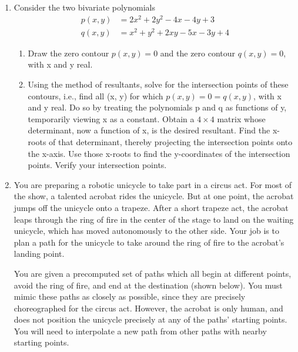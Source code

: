 \documentclass[conference,onecolumn]{IEEEtran}
\begin{document}
\begin{enumerate}[label=\arabic{enumi}.]
          \clearpage
    \item Consider the two bivariate polynomials
          \begin{align*}
              p(x, y) & = 2 x^2 + 2 y^2 - 4x - 4y + 3   \\
              q(x, y) & = x^2 + y^2 + 2xy - 5x - 3y + 4
          \end{align*}

          \begin{enumerate}
              \item Draw the zero contour $p(x, y) = 0$ and the zero contour $q(x, y) = 0$, with x and y real.
              \item Using the method of resultants, solve for the intersection points of these contours, i.e., find all (x, y) for which $p(x, y) = 0 = q(x, y)$, with x and y real.
                    Do so by treating the polynomials p and q as functions of y, temporarily viewing x as a constant.
                    Obtain a $4 \times 4$ matrix whose determinant, now a function of x, is the desired resultant.
                    Find the x-roots of that determinant, thereby projecting the intersection points onto the x-axis.
                    Use those x-roots to find the y-coordinates of the intersection points.
                    Verify your intersection points.
          \end{enumerate}

          \clearpage
    \item You are preparing a robotic unicycle to take part in a circus act.
          For most of the show, a talented acrobat rides the unicycle.
          But at one point, the acrobat jumps oﬀ the unicycle onto a trapeze.
          After a short trapeze act, the acrobat leaps through the ring of fire in the center of the stage to land on the waiting unicycle, which has moved autonomously to the other side.
          Your job is to plan a path for the unicycle to take around the ring of ﬁre to the acrobat's landing point.

          You are given a precomputed set of paths which all begin at different points, avoid the ring of ﬁre, and end at the destination (shown below).
          You must mimic these paths as closely as possible, since they are precisely choreographed for the circus act.
          However, the acrobat is only human, and does not position the unicycle precisely at any of the paths' starting points.
          You will need to interpolate a new path from other paths with nearby starting points.


\end{enumerate}
\end{document}
